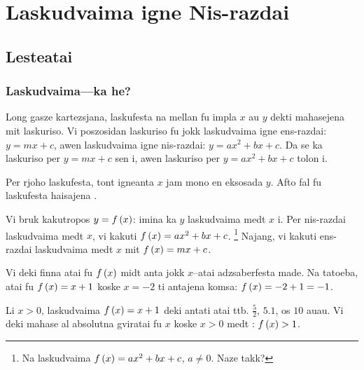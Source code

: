 \chapter{Laskudvaima igne Nis-razdai}

\section{Lesteatai}

\subsection{Laskudvaima---ka he?}

Long gasze kartezsjana, laskufesta na mellan fu impla \(x\) au \(y\) dekti mahasejena mit laskuriso.
Vi poszosidan laskuriso fu jokk laskudvaima igne ens-razdai: \(y = mx + c\), awen laskudvaima igne
nis-razdai: \(y = ax^2 + bx + c\). Da se ka laskuriso per \(y = mx + c\) sen i, awen laskuriso per
\(y = ax^2 + bx + c\) tolon i.

Per rjoho laskufesta, tont igneanta \(x\) jam mono en eksosada \(y\).
Afto fal fu laskufesta haisajena .

Vi bruk kakutropos \(y = f\left(x\right)\): imina ka \(y\) laskudvaima medt \(x\) i.
Per nis-razdai laskudvaima medt \(x\), vi kakuti
\(f \left(x\right) = ax^2 + bx + c\). \footnote{Na  laskudvaima
	\(f \left(x\right) = ax^2 + bx + c\), \(a \neq 0\). Naze takk?}
Najang, vi kakuti ens-razdai laskudvaima medt \(x\) mit \(f \left(x\right) = mx + c\).

Vi deki finna atai fu \(f \left(x\right)\) midt anta jokk \(x\)--atai adzsaberfesta made.
Na tatoeba, atai fu \(f \left(x\right) = x + 1\) koske \(x = -2\) ti antajena komsa: \(f \left(x\right) = -2 + 1 = -1\).

Li \(x > 0\), laskudvaima \(f \left(x\right) = x + 1\) deki antati atai ttb. \(\frac{5}{2}\), \(5.1\), os \(10\) auau.
Vi deki mahase al absolutna gviratai fu \(x\) koske \(x > 0\) medt : \(f \left(x\right) > 1\).


